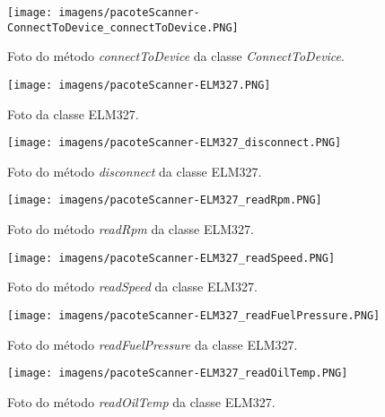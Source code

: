 \begin{figure}[!ht]
\centering
\caption{Foto do método \textit{connectToDevice} da classe \textit{ConnectToDevice}.} 
{\texttt{[image: imagens/pacoteScanner-ConnectToDevice\_connectToDevice.PNG]}}\\
 \label{Fig:connect_connect_to_device}
\end{figure}

\begin{figure}[!ht]
\centering
\caption{Foto da classe ELM327.} 
{\texttt{[image: imagens/pacoteScanner-ELM327.PNG]}}\\
 \label{Fig:elm327_class}
\end{figure}

\begin{figure}[!ht]
\centering
\caption{Foto do método \textit{disconnect} da classe ELM327.} 
{\texttt{[image: imagens/pacoteScanner-ELM327\_disconnect.PNG]}}\\
 \label{Fig:elm327_disconnect}
\end{figure}

\begin{figure}[!ht]
\centering
\caption{Foto do método \textit{readRpm} da classe ELM327.} 
{\texttt{[image: imagens/pacoteScanner-ELM327\_readRpm.PNG]}}\\
 \label{Fig:elm327_read_rpm}
\end{figure}

\begin{figure}[!ht]
\centering
\caption{Foto do método \textit{readSpeed} da classe ELM327.} 
{\texttt{[image: imagens/pacoteScanner-ELM327\_readSpeed.PNG]}}\\
 \label{Fig:elm327_read_speed}
\end{figure}

\begin{figure}[!ht]
\centering
\caption{Foto do método \textit{readFuelPressure} da classe ELM327.} 
{\texttt{[image: imagens/pacoteScanner-ELM327\_readFuelPressure.PNG]}}\\
 \label{Fig:elm327_read_fuel_pressure}
\end{figure}

\begin{figure}[!ht]
\centering
\caption{Foto do método \textit{readOilTemp} da classe ELM327.} 
{\texttt{[image: imagens/pacoteScanner-ELM327\_readOilTemp.PNG]}}\\
 \label{Fig:elm327_read_oil_temp}
\end{figure}

